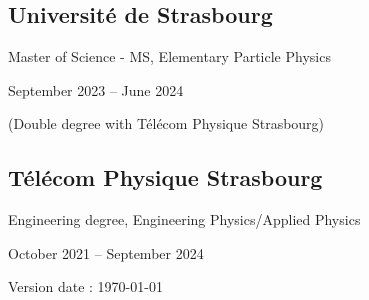 \documentclass[10pt,a4paper]{article}
\begin{document}
\subsection*{Université de Strasbourg}

\begin{minipage}{0.6\linewidth}
    Master of Science - MS, Elementary Particle Physics
\end{minipage}
\begin{minipage}{0.4\linewidth}
    \raggedleft
    September 2023 -- June 2024
\end{minipage}

(Double degree with Télécom Physique Strasbourg)


\subsection*{Télécom Physique Strasbourg}

\begin{minipage}{0.6\linewidth}
    Engineering degree, Engineering Physics/Applied Physics
\end{minipage}
\begin{minipage}{0.4\linewidth}
    \raggedleft
    October 2021 -- September 2024
\end{minipage}



\vfill
\begin{center}
    Version date : \today
\end{center}
\end{document}

